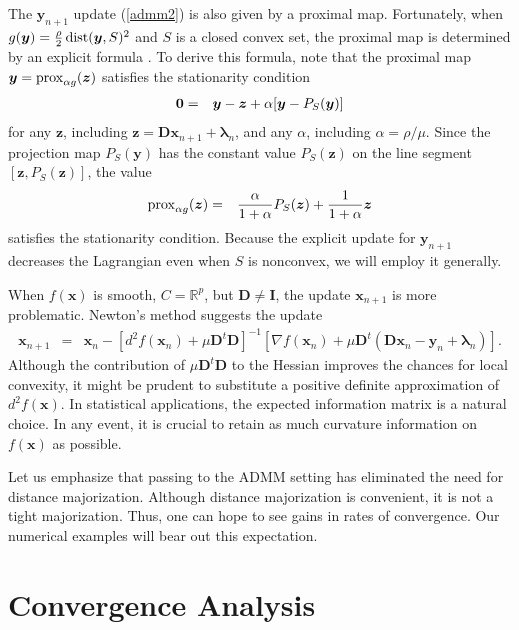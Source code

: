 \documentclass[11pt]{article}
\def\dist{\mathop{\rm dist}\nolimits}
\def\prox{\mathop{\rm prox}\nolimits}
\newcommand{\bx}{\boldsymbol{x}}
\newcommand{\by}{\boldsymbol{y}}
\newcommand{\bz}{\boldsymbol{z}}
\newcommand{\bD}{\boldsymbol{D}}
\newcommand{\bI}{\boldsymbol{I}}
\newcommand{\blambda}{\boldsymbol{\lambda}}
\begin{document}
The $\by_{n+1}$ update (\ref{admm2}) is also given by a proximal map.
Fortunately, when $g(\by)=\frac{\rho}{2}\dist(\by,S)^2$ and $S$ is a closed convex set, the proximal map is determined by an explicit formula \cite{bauschke2017convex}. To derive this formula, note that  the proximal map $\by=\prox_{\alpha g}(\bz)$ satisfies the stationarity condition
\begin{eqnarray*}
{\bf 0} & = & \by-\bz+\alpha [\by-P_S(\by)] 
\end{eqnarray*}
for any $\bz$, including $\bz = \bD\bx_{n+1}+\blambda_{n}$, and 
any $\alpha$, including $\alpha = \rho/\mu$. Since the projection map $P_S(\by)$ has the constant value $P_S(\bz)$ on the line segment 
$[\bz,P_S(\bz)]$, the value 
\begin{eqnarray*}
\prox_{\alpha g}(\bz) & = & \frac{\alpha}{1+\alpha}P_S(\bz)+\frac{1}{1+\alpha}\bz
\end{eqnarray*}
satisfies the stationarity condition. Because the explicit update
for $\by_{n+1}$ decreases the Lagrangian even when $S$ is nonconvex,
we will employ it generally.   

When $f(\bx)$ is smooth, $C=\mathbb{R}^p$, but $\bD \neq \bI$, the
update $\bx_{n+1}$ is more problematic. Newton's method suggests
the update
\begin{eqnarray*}
\bx_{n+1} & = & \bx_n - [d^2f(\bx_n)+ \mu\bD^t\bD]^{-1}
[\nabla f(\bx_n)+\mu \bD^t (\bD\bx_n-\by_n+\blambda_n)]. 
\end{eqnarray*}
Although the contribution of $\mu\bD^t\bD$ to the Hessian improves
the chances for local convexity, it might be prudent to substitute
a positive definite approximation of $d^2f(\bx)$. In statistical applications, the expected information matrix is a natural
choice. In any event, it is crucial to retain as much curvature
information on $f(\bx)$ as possible.

Let us emphasize that passing to the ADMM setting has 
eliminated the need for distance majorization. Although distance
majorization is convenient, it is not a tight majorization. Thus,
one can hope to see gains in rates of convergence. Our numerical examples will bear out this expectation.

\section*{\center Convergence Analysis}
\end{document}
